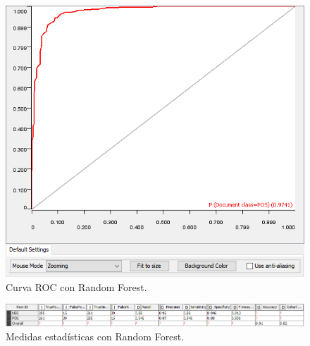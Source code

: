 \begin{figure}[H]
    \center\includegraphics[width=.95\linewidth]{img/classification/rocRF.png}
    \caption{Curva ROC con Random Forest.}
\end{figure}


\begin{figure}[H]
    \center\includegraphics[width=.95\linewidth]{img/classification/scoresRF.png}
    \caption{Medidas estadísticas con Random Forest.}
\end{figure}